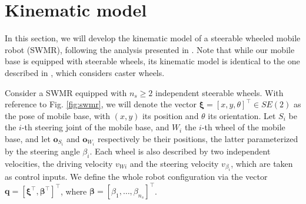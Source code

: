 %

\section{Kinematic model}
\label{sec:kinematic-model}
In this section, we will develop the kinematic model of a steerable wheeled
mobile robot (SWMR), following the analysis presented in
\cite{RobuffoGiordano2009ICRA}. Note that while our mobile base is equipped
with steerable wheels, its kinematic model is identical to the one described
in \cite{RobuffoGiordano2009ICRA}, which considers caster wheels.

Consider a SWMR equipped with $n_s \ge 2$ independent steerable wheels.
With reference to Fig. \ref{fig:swmr}, we will denote the vector
$\bm{\xi} = [x, y, \theta]^\top \in SE(2)$ as the pose of mobile base,
with $(x, y)$ its position and $\theta$ its orientation. Let $S_i$ be
the $i$-th steering joint of the mobile base, and $W_i$ the $i$-th wheel of
the mobile base, and let $\bm{o}_{S_i}$ and $\bm{o}_{W_i}$ respectively be
their positions, the latter parameterized by the steering angle $\beta_i$.
Each wheel is also described by two independent velocities, the driving
velocity $v_{Wi}$ and the steering velocity $v_{\beta_i}$, which are taken
as control inputs. We define the whole robot configuration via the vector
$\bm{q}=[\bm{\xi}^\top, \bm{\beta}^\top]^\top$, where
$\bm{\beta}=[\beta_1, \dots, \beta_{n_s}]^\top$.

